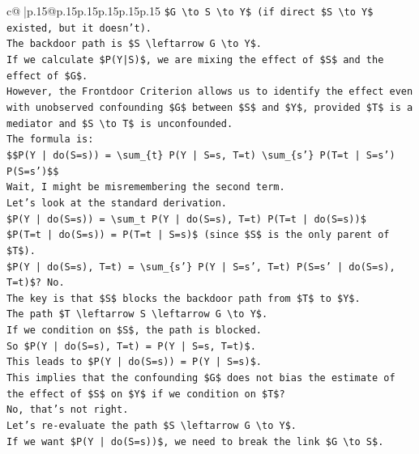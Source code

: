 \documentclass{article}
\begin{document}
{\begin{supertabular}{c@{$\;$}|p{.15\linewidth}@{}p{.15\linewidth}p{.15\linewidth}p{.15\linewidth}p{.15\linewidth}p{.15\linewidth}}
{{{\texttt{\$G \textbackslash{}to S \textbackslash{}to Y\$ (if direct \$S \textbackslash{}to Y\$ existed, but it doesn't).} \\
\texttt{The backdoor path is \$S \textbackslash{}leftarrow G \textbackslash{}to Y\$.} \\
\texttt{If we calculate \$P(Y|S)\$, we are mixing the effect of \$S\$ and the effect of \$G\$.} \\
\texttt{However, the Frontdoor Criterion allows us to identify the effect even with unobserved confounding \$G\$ between \$S\$ and \$Y\$, provided \$T\$ is a mediator and \$S \textbackslash{}to T\$ is unconfounded.} \\
\texttt{The formula is:} \\
\texttt{\$\$P(Y | do(S=s)) = \textbackslash{}sum\_\{t\} P(Y | S=s, T=t) \textbackslash{}sum\_\{s'\} P(T=t | S=s') P(S=s')\$\$} \\
\texttt{Wait, I might be misremembering the second term.} \\
\texttt{Let's look at the standard derivation.} \\
\texttt{\$P(Y | do(S=s)) = \textbackslash{}sum\_t P(Y | do(S=s), T=t) P(T=t | do(S=s))\$} \\
\texttt{\$P(T=t | do(S=s)) = P(T=t | S=s)\$ (since \$S\$ is the only parent of \$T\$).} \\
\texttt{\$P(Y | do(S=s), T=t) = \textbackslash{}sum\_\{s'\} P(Y | S=s', T=t) P(S=s' | do(S=s), T=t)\$? No.} \\
\texttt{The key is that \$S\$ blocks the backdoor path from \$T\$ to \$Y\$.} \\
\texttt{The path \$T \textbackslash{}leftarrow S \textbackslash{}leftarrow G \textbackslash{}to Y\$.} \\
\texttt{If we condition on \$S\$, the path is blocked.} \\
\texttt{So \$P(Y | do(S=s), T=t) = P(Y | S=s, T=t)\$.} \\
\texttt{This leads to \$P(Y | do(S=s)) = P(Y | S=s)\$.} \\
\texttt{This implies that the confounding \$G\$ does not bias the estimate of the effect of \$S\$ on \$Y\$ if we condition on \$T\$?} \\
\texttt{No, that's not right.} \\
\texttt{Let's re{-}evaluate the path \$S \textbackslash{}leftarrow G \textbackslash{}to Y\$.} \\
\texttt{If we want \$P(Y | do(S=s))\$, we need to break the link \$G \textbackslash{}to S\$.} \\
}}}
\end{supertabular}}
\end{document}
